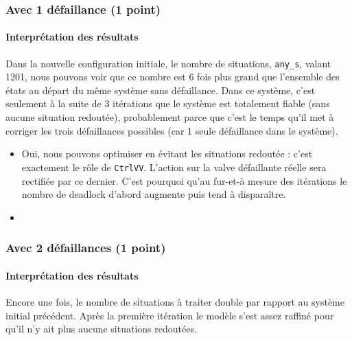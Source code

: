 \documentclass[a4paper]{book}
\begin{document}
\subsubsection{Avec 1 défaillance (1 point)}





\paragraph{Interprétation des résultats}

Dans la nouvelle configuration initiale, le nombre de situations, {\tt any\_s}, valant 1201, nous pouvons voir que ce nombre est 6 fois plus grand que l'ensemble des états au départ du même système sans défaillance.
Dans ce système, c'est seulement à la suite de 3 itérations que le système est totalement fiable (sans aucune situation redoutée), probablement parce que c'est le temps qu'il met à corriger les trois défaillances possibles (car 1 seule défaillance dans le système).

\begin{itemize}
	\item Oui, nous pouvons optimiser en évitant les situations redoutée : c'est exactement le rôle de {\tt CtrlVV}. L'action sur la valve défaillante réelle sera rectifiée par ce dernier. C'est pourquoi qu'au fur-et-à mesure des itérations le nombre de deadlock d'abord augmente puis tend à disparaître.
	\item 
\end{itemize}

\subsubsection{Avec 2 défaillances (1 point)}





\paragraph{Interprétation des résultats}

Encore une fois, le nombre de situations à traiter double par rapport au système initial précédent. Après la première itération le modèle s'est assez raffiné pour qu'il n'y ait plus aucune situations redoutées.
\end{document}
